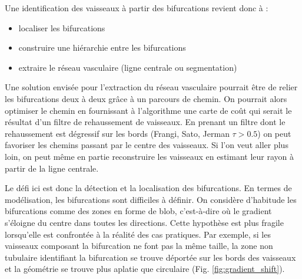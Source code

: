 Une identification des vaisseaux à partir des bifurcations revient donc à :

\begin{itemize}
\item localiser les bifurcations
\item construire une hiérarchie entre les bifurcations
\item extraire le réseau vasculaire (ligne centrale ou segmentation)
\end{itemize}

Une solution envisée pour l'extraction du réseau vasculaire pourrait être de relier les bifurcations deux à deux grâce à un parcours de chemin. On pourrait alors optimiser le chemin en fournissant à l'algorithme une carte de coût qui serait le résultat d'un filtre de rehaussement de vaisseaux. En prenant un filtre dont le rehaussement est dégressif sur les bords (Frangi, Sato, Jerman $\tau > 0.5$) on peut favoriser les chemins passant par le centre des vaisseaux. Si l'on veut aller plus loin, on peut même en partie reconstruire les vaisseaux en estimant leur rayon à partir de la ligne centrale.

Le défi ici est donc la détection et la localisation des bifurcations. En termes de modélisation, les bifurcations sont difficiles à définir. On considère d'habitude les bifurcations comme des zones en forme de blob, c'est-à-dire où le gradient s'éloigne du centre dans toutes les directions. Cette hypothèse est plus fragile lorsqu'elle est confrontée à la réalité des cas pratiques. Par exemple, si les vaisseaux composant la bifurcation ne font pas la même taille, la zone non tubulaire identifiant la bifurcation se trouve déportée sur les bords des vaisseaux et la géométrie se trouve plus aplatie que circulaire (Fig. \ref{fig:gradient_shift}). 

